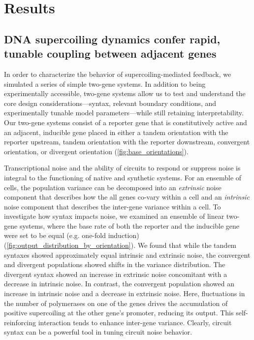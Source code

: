 \documentclass[11pt]{article}
\begin{document}
\section{Results}

\subsection{DNA supercoiling dynamics confer rapid, tunable coupling between adjacent genes}
In order to characterize the behavior of supercoiling-mediated feedback, we simulated a series of simple two-gene systems. In addition to being experimentally accessible, two-gene systems allow us to test and understand the core design considerations---syntax, relevant boundary conditions, and experimentally tunable model parameters---while still retaining interpretability. Our two-gene systems consist of a reporter gene that is constitutively active and an adjacent, inducible gene placed in either a tandem orientation with the reporter upstream, tandem orientation with the reporter downstream, convergent orientation, or divergent orientation (\cref{fig:base_orientations}).


Transcriptional noise and the ability of circuits to respond or suppress noise is integral to the functioning of native and synthetic systems. For an ensemble of cells, the population variance can be decomposed into an \emph{extrinsic} noise component that describes how the all genes co-vary within a cell and an \emph{intrinsic} noise component that describes the inter-gene variance within a cell. To investigate how syntax impacts noise, we examined an ensemble of linear two-gene systems, where the base rate of both the reporter and the inducible gene were set to be equal (e.g. one-fold induction) (\cref{fig:output_distribution_by_orientation}). We found that while the tandem syntaxes showed approximately equal intrinsic and extrinsic noise, the convergent and divergent populations showed shifts in the variance distribution.
The divergent syntax showed an increase in extrinsic noise concomitant with a decrease in intrinsic noise.
In contrast, the convergent population showed an increase in intrinsic noise and a decrease in extrinsic noise. Here, fluctuations in the number of polymerases on one of the genes drives the accumulation of positive supercoiling at the other gene's promoter, reducing its output. This self-reinforcing interaction tends to enhance inter-gene variance. Clearly, circuit syntax can be a powerful tool in tuning circuit noise behavior.
\end{document}
